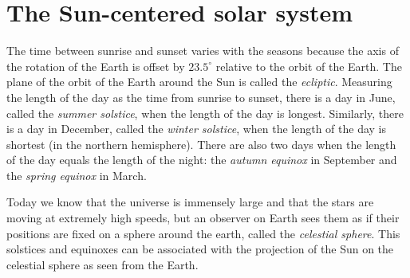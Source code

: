 

\chapter{The Sun-centered solar system}\label{s.copernicus}

The time between sunrise and sunset varies with the seasons because the axis of the rotation of the Earth is offset by $23.5^\circ{}$ relative to the orbit of the Earth. The plane of the orbit of the Earth around the Sun is called the \emph{ecliptic}. Measuring the length of the day as the time from sunrise to sunset, there is a day in June, called the \emph{summer solstice}, when the length of the day is longest. Similarly, there is a day in December, called the \emph{winter solstice}, when the length of the day is shortest (in the northern hemisphere). There are also two days when the length of the day equals the length of the night: the \emph{autumn equinox} in September and the \emph{spring equinox} in March.

Today we know that the universe is immensely large and that the stars are moving at extremely high speeds, but an observer on Earth sees them as if their positions are fixed on a sphere around the earth, called the \emph{celestial sphere}. This solstices and equinoxes can be associated with the projection of the Sun on the celestial sphere as seen from the Earth.

